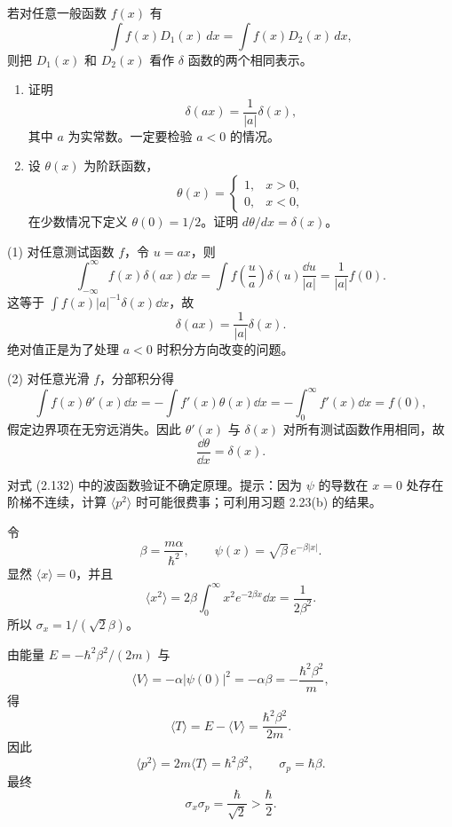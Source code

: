 \begin{question}
若对任意一般函数 $f(x)$ 有
\[
\int f(x)D_1(x)\,dx=\int f(x)D_2(x)\,dx,
\]
则把 $D_1(x)$ 和 $D_2(x)$ 看作 $\delta$ 函数的两个相同表示。
\begin{enumerate}
\item 证明
\[
\delta(ax)=\frac{1}{|a|}\delta(x),
\]
其中 $a$ 为实常数。一定要检验 $a<0$ 的情况。
\item 设 $\theta(x)$ 为阶跃函数，
\[
\theta(x)=\begin{cases}1,&x>0,\\0,&x<0,
\end{cases}
\]
在少数情况下定义 $\theta(0)=1/2$。证明 $d\theta/dx=\delta(x)$。
\end{enumerate}
\end{question}
\begin{solution}
(1) 对任意测试函数 $f$，令 $u=ax$，则
\[
\int_{-\infty}^{\infty}f(x)\delta(ax)\dd x
=\int f\left(\frac{u}{a}\right)\delta(u)\frac{\dd u}{|a|}
=\frac1{|a|}f(0).
\]
这等于 $\int f(x)|a|^{-1}\delta(x)\dd x$，故
\[
\delta(ax)=\frac1{|a|}\delta(x).
\]
绝对值正是为了处理 $a<0$ 时积分方向改变的问题。

(2) 对任意光滑 $f$，分部积分得
\[
\int f(x)\theta'(x)\dd x
=-\int f'(x)\theta(x)\dd x
=-\int_0^\infty f'(x)\dd x=f(0),
\]
假定边界项在无穷远消失。因此 $\theta'(x)$ 与 $\delta(x)$ 对所有测试函数作用相同，故
\[
\frac{\dd\theta}{\dd x}=\delta(x).
\]
\end{solution}

\begin{question}
对式 (2.132) 中的波函数验证不确定原理。提示：因为 $\psi$ 的导数在 $x=0$ 处存在阶梯不连续，计算 $\langle p^2\rangle$ 时可能很费事；可利用习题 2.23(b) 的结果。

\par\smallskip
{}

\end{question}
\begin{solution}
令
\[
\beta=\frac{m\alpha}{\hbar^2},
\qquad
\psi(x)=\sqrt\beta\,e^{-\beta |x|}.
\]
显然 $\langle x\rangle=0$，并且
\[
\langle x^2\rangle=2\beta\int_0^\infty x^2e^{-2\beta x}\dd x=\frac1{2\beta^2}.
\]
所以 $\sigma_x=1/(\sqrt2\beta)$。

由能量 $E=-\hbar^2\beta^2/(2m)$ 与
\[
\langle V\rangle=-\alpha |\psi(0)|^2=-\alpha\beta=-\frac{\hbar^2\beta^2}{m},
\]
得
\[
\langle T\rangle=E-\langle V\rangle=\frac{\hbar^2\beta^2}{2m}.
\]
因此
\[
\langle p^2\rangle=2m\langle T\rangle=\hbar^2\beta^2,
\qquad
\sigma_p=\hbar\beta.
\]
最终
\[
\sigma_x\sigma_p=\frac{\hbar}{\sqrt2}>\frac\hbar2.
\]
\end{solution}

